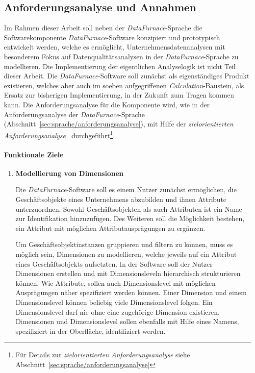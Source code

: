 \documentclass[
  language=german, %
  type=bachelor%
]{isthesis}
\begin{document}
\begin{content}
  \section{Anforderungsanalyse und Annahmen}\label{sec:software/anforderungsanalyse}

	Im Rahmen dieser Arbeit soll neben der \textit{DataFurnace}-Sprache die
	Softwarekomponente \textit{DataFurnace}-Software konzipiert und
	prototypisch entwickelt werden, welche es ermöglicht,
	Unternehmensdatenanalysen mit besonderem Fokus auf Datenqualitätsanalysen
	in der \textit{DataFurnace}-Sprache zu modellieren. Die Implementierung der
	eigentlichen Analyselogik ist nicht Teil dieser Arbeit.  Die
	\textit{DataFurnace}-Software soll zunächst als eigenständiges Produkt
	existieren, welches aber auch im soeben aufgegriffenen
	\textit{Calculation}-Baustein, als Ersatz zur bisherigen Implementierung, in
	der Zukunft zum Tragen kommen kann. Die Anforderungsanalyse für die
	Komponente wird, wie in der Anforderungsanalyse der
	\textit{DataFurnace}-Sprache
	(Abschnitt~\ref{sec:sprache/anforderungsanalyse}), mit Hilfe der
	\textit{zielorientierten Anforderungsanalyse}~\cite[][]{van2001goal}
	durchgeführt\footnote{Für Details zur \textit{zielorientierten
	Anforderungsanalyse} siehe Abschnitt~\ref{sec:sprache/anforderungsanalyse}}. 


  \paragraph{Funktionale Ziele}
  \begin{enumerate}
    \item \textbf{Modellierung von Dimensionen}

      Die \textit{DataFurnace}-Software soll es einem Nutzer zunächst
      ermöglichen, die Geschäftsobjekte eines Unternehmens abzubilden und ihnen
      Attribute unterzuordnen. Sowohl Geschäftsobjekten als auch Attributen
      ist ein Name zur Identifikation hinzuzufügen. Des Weiteren soll die
      Möglichkeit bestehen, ein Attribut mit möglichen Attributausprägungen zu
      ergänzen.

      Um Geschäftsobjektinstanzen gruppieren und filtern zu können, muss es
      möglich sein, Dimensionen zu modellieren, welche jeweils auf ein Attribut
      eines Geschäftsobjekts aufsetzten. In der Software soll der Nutzer
      Dimensionen erstellen und mit Dimensionsleveln hierarchisch strukturieren
      können. Wie Attribute, sollen auch Dimensionslevel mit möglichen
      Ausprägungen näher spezifiziert werden können. Einer Dimension und einem
      Dimensionslevel können beliebig viele Dimensionslevel folgen. Ein
      Dimensionslevel darf nie ohne eine zugehörige Dimension existieren.
      Dimensionen und Dimensionslevel sollen ebenfalls mit Hilfe eines Namens,
      spezifiziert in der Oberfläche, identifiziert werden.


\end{enumerate}
\end{content}
\end{document}
